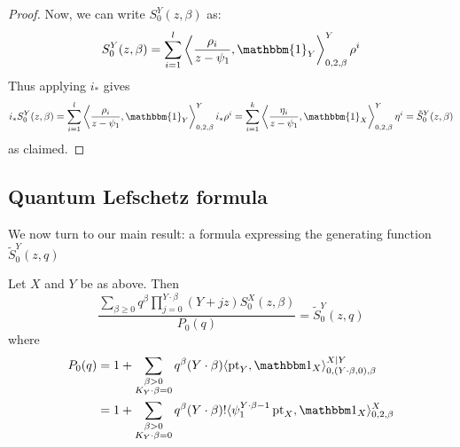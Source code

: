 \begin{proof}
\begin{comment}
where the last equality holds because $\gamma \in i^*\HH^*(X)^\perp$. So indeed $i_* \gamma = 0$ and so $i_* \rho_{k+1} = \ldots = i_* \rho_l = 0$. \end{comment}
Now, we can write $S_0^Y(z,\beta)$ as:
\begin{equation*} S_0^Y(z,\beta) = \sum_{i=1}^l \left\langle \dfrac{\rho_i}{z-\psi_1} , \mathbbm{1}_Y \right\rangle_{0,2,\beta}^Y  \rho^i \end{equation*}
Thus applying $i_*$ gives
\begin{align*} i_* S_0^Y(z,\beta)  = \sum_{i=1}^l \left\langle \dfrac{\rho_i}{z-\psi_1} , \mathbbm{1}_Y \right\rangle_{0,2,\beta}^Y   i_* \rho^i
= \sum_{i=1}^k \left\langle \dfrac{\eta_i}{z-\psi_1}, \mathbbm{1}_X \right\rangle_{0,2,\beta}^Y   \eta^i = \tilde{S}_0^Y(z,\beta) \end{align*}
as claimed. \end{proof}


\subsection{Quantum Lefschetz formula} We now turn to our main result: a formula expressing the generating function $\tilde{S}_0^Y(z,q)$ 


\begin{thm} \label{Theorem Quantum Lefschetz}
Let $X$ and $Y$ be as above. Then
\begin{equation}\label{eqn:mirror}
\dfrac{\sum_{\beta\geq 0} q^\beta\prod_{j=0}^{Y\cdot\beta}(Y+jz)S_0^X(z,\beta)}{P_0(q)}= \tilde{S}_0^Y(z,q)
\end{equation}
where
\begin{align*}
 P_0(q) & = 1 + \sum_{\substack{\beta>0 \\ K_Y\cdot\beta=0}} q^\beta (Y\cdot\beta) \langle \pt_Y,\mathbbm 1_{X}\rangle_{0,(Y\cdot\beta,0),\beta}^{X|Y} \\
& = 1 + \sum_{\substack{\beta>0 \\ K_Y\cdot\beta=0}} q^\beta(Y\cdot\beta)!\langle\psi_1^{Y\cdot\beta-1} \pt_X,\mathbbm 1_{X}\rangle_{0,2,\beta}^X
\end{align*}
\end{thm}

